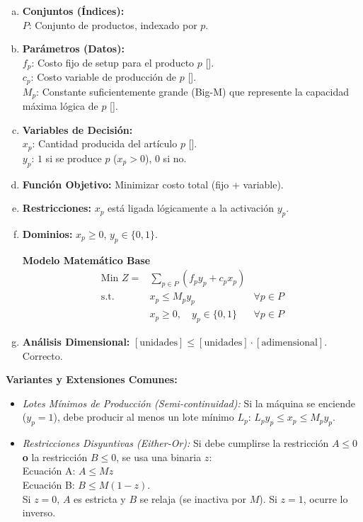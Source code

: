 \documentclass{article}
\begin{document}
	\begin{enumerate}[a)]
		\item \textbf{Conjuntos (Índices):}\\
		$P$: Conjunto de productos, indexado por $p$.
		
		\item \textbf{Parámetros (Datos):}\\
		$f_p$: Costo fijo de setup para el producto $p$ [\text{\$}].\\
		$c_p$: Costo variable de producción de $p$ [].\\
		$M_p$: Constante suficientemente grande (Big-M) que represente la capacidad máxima lógica de $p$ [].
		
		\item \textbf{Variables de Decisión:}\\
		$x_p$: Cantidad producida del artículo $p$ [].\\
		$y_p$: $1$ si se produce $p$ ($x_p > 0$), $0$ si no.
		\item \textbf{Función Objetivo:} Minimizar costo total (fijo + variable).
		\item \textbf{Restricciones:} $x_p$ está ligada lógicamente a la activación $y_p$.
		\item \textbf{Dominios:} $x_p \geq 0$, $y_p \in \{0, 1\}$.
		
		\begin{center}
			\textbf{Modelo Matemático Base}
			$$\begin{aligned}
				\text{Min } Z = & \sum_{p \in P} (f_p y_p + c_p x_p) \\
				\text{s.t.} \quad & x_p \leq M_p y_p & \forall p \in P \\
				& x_p \geq 0, \quad y_p \in \{0, 1\} & \forall p \in P
			\end{aligned}$$
		\end{center}
		
		\item \textbf{Análisis Dimensional:} $[\text{unidades}] \leq [\text{unidades}] \cdot [\text{adimensional}]$. Correcto.
	\end{enumerate}
	
	\textbf{Variantes y Extensiones Comunes:}
	\begin{itemize}
		\item \textit{Lotes Mínimos de Producción (Semi-continuidad):} Si la máquina se enciende ($y_p=1$), debe producir al menos un lote mínimo $L_p$: $L_p y_p \leq x_p \leq M_p y_p$.
		\item \textit{Restricciones Disyuntivas (Either-Or):} Si debe cumplirse la restricción $A \le 0$ \textbf{o} la restricción $B \le 0$, se usa una binaria $z$: \\
		Ecuación A: $A \leq M z$ \\
		Ecuación B: $B \leq M (1-z)$. \\
		Si $z=0$, $A$ es estricta y $B$ se relaja (se inactiva por $M$). Si $z=1$, ocurre lo inverso.
	\end{itemize}
	
\end{document}
